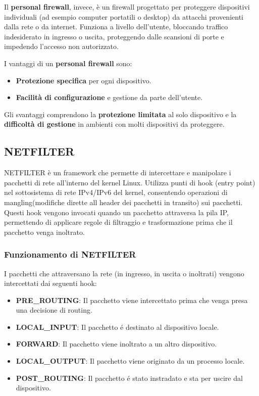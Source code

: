 Il \textbf{personal firewall}, invece, è un firewall progettato per proteggere dispositivi individuali (ad esempio computer portatili o desktop) da attacchi provenienti dalla rete o da internet. Funziona a livello dell'utente, bloccando traffico indesiderato in ingresso o uscita, proteggendo dalle scansioni di porte e impedendo l'accesso non autorizzato.

I vantaggi di un \textbf{personal firewall} sono:
\begin{itemize}
  \item \textbf{Protezione specifica} per ogni dispositivo.
  \item \textbf{Facilità di configurazione} e gestione da parte dell'utente.
\end{itemize}
Gli svantaggi comprendono la \textbf{protezione limitata} al solo dispositivo e la \textbf{difficoltà di gestione} in ambienti con molti dispositivi da proteggere.
\subsection{NETFILTER}

NETFILTER è un framework che permette di intercettare e manipolare i pacchetti di rete all'interno del kernel Linux. Utilizza punti di hook (entry point) nel sottosistema di rete IPv4/IPv6 del kernel, consentendo operazioni di mangling(modifiche dirette all header dei pacchetti in transito) sui pacchetti. Questi hook vengono invocati quando un pacchetto attraversa la pila IP, permettendo di applicare regole di filtraggio e trasformazione prima che il pacchetto venga inoltrato.

\subsubsection{Funzionamento di NETFILTER}
I pacchetti che attraversano la rete (in ingresso, in uscita o inoltrati) vengono intercettati dai seguenti hook:

\begin{itemize}
  \item \textbf{PRE\_ROUTING}: Il pacchetto viene intercettato prima che venga presa una decisione di routing.
  \item \textbf{LOCAL\_INPUT}: Il pacchetto \'e destinato al dispositivo locale.
  \item \textbf{FORWARD}: Il pacchetto viene inoltrato a un altro dispositivo.
  \item \textbf{LOCAL\_OUTPUT}: Il pacchetto viene originato da un processo locale.
  \item \textbf{POST\_ROUTING}: Il pacchetto \'e stato instradato e sta per uscire dal dispositivo.
\end{itemize}

